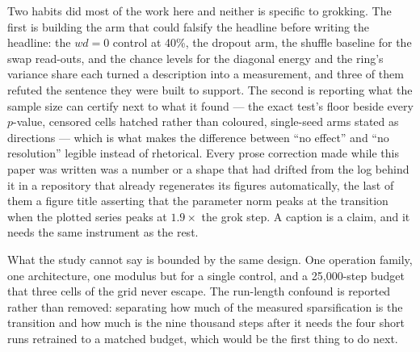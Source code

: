 \documentclass[11pt]{article}
\begin{document}
Two habits did most of the work here and neither is specific to grokking. The
first is building the arm that could falsify the headline before writing the
headline: the $wd = 0$ control at 40\%, the dropout arm, the shuffle baseline
for the swap read-outs, and the chance levels for the diagonal energy and the
ring's variance share each turned a description into a measurement, and three
of them refuted the sentence they were built to support. The second is
reporting what the sample size can certify next to what it found --- the exact
test's floor beside every $p$-value, censored cells hatched rather than
coloured, single-seed arms stated as directions --- which is what makes the
difference between ``no effect'' and ``no resolution'' legible instead of
rhetorical. Every prose correction made while this paper was written was a
number or a shape that had drifted from the log behind it in a repository that
already regenerates its figures automatically, the last of them a figure title
asserting that the parameter norm peaks at the transition when the plotted
series peaks at $1.9\times$ the grok step. A caption is a claim, and it needs
the same instrument as the rest.

What the study cannot say is bounded by the same design. One operation family,
one architecture, one modulus but for a single control, and a 25{,}000-step
budget that three cells of the grid never escape. The run-length confound is
reported rather than removed: separating how much of the measured
sparsification is the transition and how much is the nine thousand steps after
it needs the four short runs retrained to a matched budget, which would be the
first thing to do next.



\end{document}
